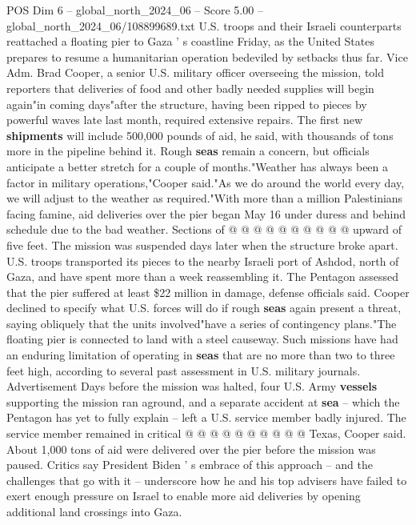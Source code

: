 \begin{textsample}{POS Dim 6 – global\_north\_2024\_06 – Score 5.00 – global\_north\_2024\_06/108899689.txt}  \label{ex:f6_pos_149}
U.S. troops and their Israeli counterparts reattached a floating pier to Gaza ' s coastline Friday, as the United States prepares to resume a humanitarian operation bedeviled by setbacks thus far.
Vice Adm.
Brad Cooper, a senior U.S. military officer overseeing the mission, told reporters that deliveries of food and other badly needed supplies will begin again"in coming days"after the structure, having been ripped to pieces by powerful waves late last month, required extensive repairs.
The first new \textbf{shipments} will include 500,000 pounds of aid, he said, with thousands of tons more in the pipeline behind it.
Rough \textbf{seas} remain a concern, but officials anticipate a better stretch for a couple of months."Weather has always been a factor in military operations,"Cooper said."As we do around the world every day, we will adjust to the weather as required."With more than a million Palestinians facing famine, aid deliveries over the pier began May 16 under duress and behind schedule due to the bad weather.
Sections of @ @ @ @ @ @ @ @ @ @ upward of five feet.
The mission was suspended days later when the structure broke apart.
U.S. troops transported its pieces to the nearby Israeli port of Ashdod, north of Gaza, and have spent more than a week reassembling it.
The Pentagon assessed that the pier suffered at least \$22 million in damage, defense officials said.
Cooper declined to specify what U.S. forces will do if rough \textbf{seas} again present a threat, saying obliquely that the units involved"have a series of contingency plans."The floating pier is connected to land with a steel causeway.
Such missions have had an enduring limitation of operating in \textbf{seas} that are no more than two to three feet high, according to several past assessment in U.S. military journals.
Advertisement Days before the mission was halted, four U.S.
Army \textbf{vessels} supporting the mission ran aground, and a separate accident at \textbf{sea} -- which the Pentagon has yet to fully explain -- left a U.S. service member badly injured.
The service member remained in critical @ @ @ @ @ @ @ @ @ @ Texas, Cooper said.
About 1,000 tons of aid were delivered over the pier before the mission was paused.
Critics say President Biden ' s embrace of this approach -- and the challenges that go with it -- underscore how he and his top advisers have failed to exert enough pressure on Israel to enable more aid deliveries by opening additional land crossings into Gaza.

\end{textsample}

